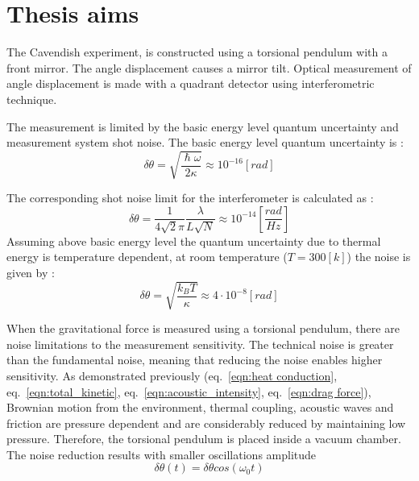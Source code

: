\documentclass[\main/master.tex]{subfiles}
\begin{document}
\chapter{Thesis aims}\label{chapter:Thesis aims}

The Cavendish experiment, is constructed using a torsional pendulum with a front mirror. The angle displacement causes a mirror tilt. Optical measurement of angle displacement is made with a quadrant detector using interferometric technique.
\par\noindent
The measurement is limited by the basic energy level quantum uncertainty and measurement system shot noise. The basic energy level quantum uncertainty is \cite{howell2019}:
\begin{equation}
\delta\theta= \sqrt{\frac{\hslash\omega}{2\kappa}} \approx 10^{-16} [rad]    \label{eqn:basic uncertainty}
\end{equation}
\par\noindent
The corresponding shot noise limit for the interferometer is calculated as \cite{howell2019}:
\begin{equation}
\delta\theta = \frac{1}{4\sqrt{2}\pi}\frac{\lambda}{L\sqrt{N}} \approx
10^{-14} [\frac{rad}{Hz}]    \label{eqn:shot limit}
\end{equation}
Assuming above basic energy level the quantum uncertainty due to thermal energy is temperature dependent, at room temperature ($T = 300[k]$) the noise is given by \cite{howell2019}:
\begin{equation}
\delta\theta = \sqrt{\frac{k_B T}{\kappa}} \approx 4\cdot 10^{-8} [rad] \label{eqn:Brownian uncertainty 3}
\end{equation}
\par\noindent
When the gravitational force is measured using a torsional pendulum, there are noise limitations to the measurement sensitivity. The technical noise is greater than the fundamental noise, meaning that reducing the noise enables higher sensitivity. As demonstrated previously (eq.~\ref{eqn:heat conduction}, eq.~\ref{eqn:total_kinetic}, eq.~\ref{eqn:acoustic_intensity}, eq.~\ref{eqn:drag force}), Brownian motion from the environment, thermal coupling, acoustic waves and friction are pressure dependent and are considerably reduced by maintaining low pressure. Therefore, the torsional pendulum is placed inside a vacuum chamber. The noise reduction results with smaller oscillations amplitude %
\begin{equation}
\delta\theta(t) = \delta\theta cos(\omega_0 t)   \label{eqn:pid_error}
\end{equation}
\end{document}
